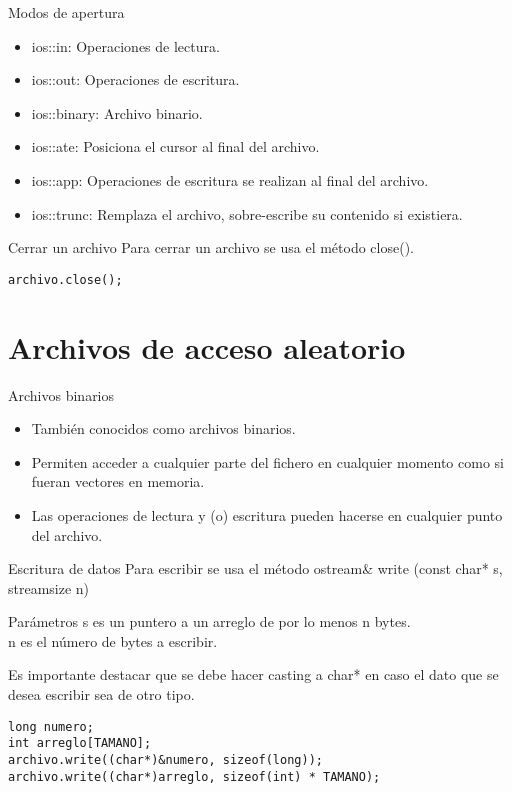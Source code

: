 \documentclass[aspectratio=169]{beamer}
\begin{document}
\begin{frame}{Modos de apertura}
\begin{itemize}
\item ios::in: Operaciones de lectura.
\item ios::out: Operaciones de escritura.
\item ios::binary: Archivo binario.
\item ios::ate: Posiciona el cursor al final del archivo.
\item ios::app: Operaciones de escritura se realizan al final del archivo.
\item ios::trunc: Remplaza el archivo, sobre-escribe su contenido si existiera.
\end{itemize}
\end{frame}

\begin{frame}[fragile]{Cerrar un archivo}
Para cerrar un archivo se usa el método close().
\begin{lstlisting}
archivo.close();
\end{lstlisting}
\end{frame}

\section{Archivos de acceso aleatorio}
\begin{frame}{Archivos binarios}
\begin{itemize}
\item También conocidos como archivos binarios.
\item Permiten acceder a cualquier parte del fichero en cualquier momento como si fueran vectores en memoria.
\item Las operaciones de lectura y (o) escritura pueden hacerse en cualquier punto del archivo.
\end{itemize}
\end{frame}

\begin{frame}[fragile]{Escritura de datos}
Para escribir se usa el método ostream\& write (const char* s, streamsize n)
\begin{block}{Parámetros}
\alert{s} es un puntero a un arreglo de por lo menos n bytes.\\
\alert{n} es el número de bytes a escribir.
\end{block}
Es importante destacar que se debe hacer casting a char* en caso el dato que se
desea escribir sea de otro tipo.
\begin{lstlisting}
long numero;
int arreglo[TAMANO];
archivo.write((char*)&numero, sizeof(long));
archivo.write((char*)arreglo, sizeof(int) * TAMANO);
\end{lstlisting}
\end{frame}
\end{document}
